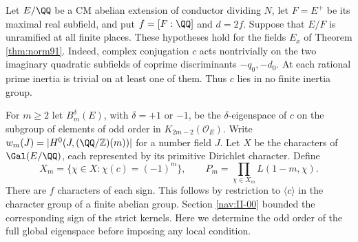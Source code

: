 \documentclass[a4paper,11pt]{article}
\theoremstyle{definition}
\theoremstyle{remark}
\newcommand{\ZZ}{\mathbb Z}\newcommand{\ord}{\operatorname{ord}}
\numberwithin{equation}{section}
\newcommand{\OO}{\mathcal O}
\begin{document}
Let \(E/\QQ\) be a CM abelian extension of conductor dividing
\(N\), let \(F=E^+\) be its maximal real subfield, and put
\(f=[F:\QQ]\) and \(d=2f\). Suppose that \(E/F\) is unramified
at all finite places. These hypotheses hold for the fields \(E_x\)
of Theorem \ref{thm:norm91}.
Indeed, complex conjugation \(c\) acts nontrivially on the two
imaginary quadratic subfields of coprime discriminants \(-q_0,-d_0\).
At each rational prime inertia is trivial on at least one of them.
Thus \(c\) lies in no finite inertia group.

For \(m\ge2\) let \(B_m^\delta(E)\), with \(\delta=+1\) or \(-1\),
be the \(\delta\)-eigenspace of \(c\) on the subgroup of elements
of odd order in \(K_{2m-2}(\OO_E)\). Write
\(w_m(J)=|H^0(J,(\QQ/\ZZ)(m))|\) for a number field \(J\).
Let \(X\) be the characters of \(\Gal(E/\QQ)\), each represented by
its primitive Dirichlet character. Define
\[
 X_m=\{\chi\in X:\chi(c)=(-1)^m\},
 \qquad P_m=\prod_{\chi\in X_m}L(1-m,\chi).
\]
There are \(f\) characters of each sign. This follows by restriction
to \(\langle c\rangle\) in the character group of a finite abelian
group. Section \ref{nav:II-00} bounded the corresponding sign of the
strict kernels. Here we determine the odd order of the full global
eigenspace before imposing any local condition.
\end{document}
